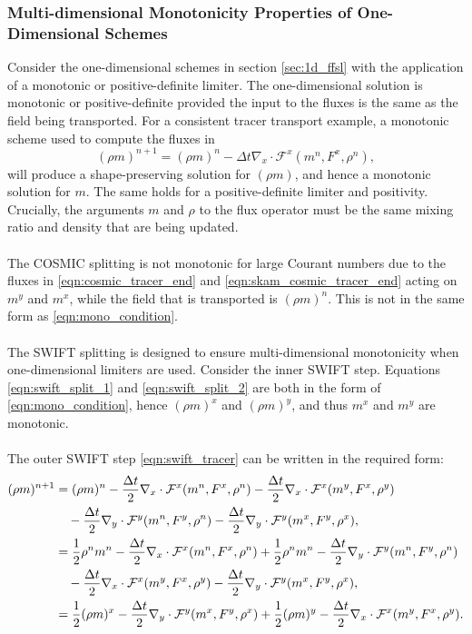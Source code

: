 \documentclass[11pt,a4paper]{article}
\begin{document}
\subsubsection{Multi-dimensional Monotonicity Properties of One-Dimensional Schemes}
Consider the one-dimensional schemes in section \ref{sec:1d_ffsl} with the application of a monotonic or positive-definite limiter. The one-dimensional solution is monotonic or positive-definite provided the input to the fluxes is the same as the field being transported. For a consistent tracer transport example, a monotonic scheme used to compute the fluxes in
\begin{equation} \label{eqn:mono_condition}
    (\rho m)^{n+1} = (\rho m)^n - \Delta{t} \nabla_x\cdot \mathcal{F}^x(m^n, F^x, \rho^n), 
\end{equation}
will produce a shape-preserving solution for $(\rho m)$, and hence a monotonic solution for $m$. The same holds for a positive-definite limiter and positivity.
Crucially, the arguments $m$ and $\rho$ to the flux operator must be the same mixing ratio and density that are being updated. \\
\\
The COSMIC splitting is not monotonic for large Courant numbers due to the fluxes in \eqref{eqn:cosmic_tracer_end} and \eqref{eqn:skam_cosmic_tracer_end} acting on $m^y$ and $m^x$, while the field that is transported is $(\rho m)^n$. This is not in the same form as \eqref{eqn:mono_condition}. \\ 
\\
The SWIFT splitting is designed to ensure multi-dimensional monotonicity when one-dimensional limiters are used. Consider the inner SWIFT step. Equations \eqref{eqn:swift_split_1} and \eqref{eqn:swift_split_2} are both in the form of \eqref{eqn:mono_condition}, hence $(\rho m)^x$ and $(\rho m)^y$, and thus $m^x$ and $m^y$ are monotonic. \\
\\
The outer SWIFT step \eqref{eqn:swift_tracer} can be written in the required form:
\begin{subequations}
\begin{align}
    (\rho m)^{n+1} & = (\rho m)^n -\frac{\Delta{t}}{2}\nabla_x\cdot \mathcal{F}^x(m^n,F^{x},\rho^n) -\frac{\Delta{t}}{2}\nabla_x\cdot \mathcal{F}^x(m^y,F^{x},\rho^y) \\ \notag
    &\quad -\frac{\Delta{t}}{2}\nabla_y\cdot \mathcal{F}^y(m^n,F^{y},\rho^n) -\frac{\Delta{t}}{2}\nabla_y\cdot \mathcal{F}^y(m^x,F^{y},\rho^x), \\
    & =\frac{1}{2} \rho^n m^n -\frac{\Delta{t}}{2}\nabla_x\cdot \mathcal{F}^x(m^n,F^{x},\rho^n) + \frac{1}{2} \rho^n m^n -\frac{\Delta{t}}{2}\nabla_y\cdot \mathcal{F}^y(m^n,F^{y},\rho^n) \\ \notag
    &\quad - \frac{\Delta{t}}{2}\nabla_x\cdot \mathcal{F}^x(m^y,F^{x},\rho^y) -\frac{\Delta{t}}{2}\nabla_y\cdot \mathcal{F}^y(m^x,F^{y},\rho^x), \\
    & = \frac{1}{2}(\rho m)^x  -\frac{\Delta{t}}{2}\nabla_y\cdot \mathcal{F}^y(m^x,F^{y},\rho^x) +  \frac{1}{2}(\rho m)^y - \frac{\Delta{t}}{2}\nabla_x\cdot \mathcal{F}^x(m^y,F^{x},\rho^y). \label{eqn:swift_is_monotonic}
\end{align}
\end{subequations}
\end{document}

